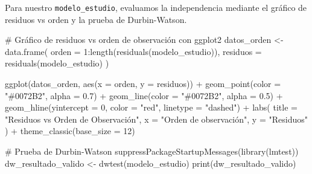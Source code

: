 \documentclass[
  letterpaper,
  DIV=11,
  numbers=noendperiod]{scrreprt}
\newenvironment{Shaded}{\begin{snugshade}}{\end{snugshade}}
\newcommand{\AttributeTok}[1]{\textcolor[rgb]{0.40,0.45,0.13}{#1}}
\newcommand{\CommentTok}[1]{\textcolor[rgb]{0.37,0.37,0.37}{#1}}
\newcommand{\DecValTok}[1]{\textcolor[rgb]{0.68,0.00,0.00}{#1}}
\newcommand{\FloatTok}[1]{\textcolor[rgb]{0.68,0.00,0.00}{#1}}
\newcommand{\FunctionTok}[1]{\textcolor[rgb]{0.28,0.35,0.67}{#1}}
\newcommand{\NormalTok}[1]{\textcolor[rgb]{0.00,0.23,0.31}{#1}}
\newcommand{\OtherTok}[1]{\textcolor[rgb]{0.00,0.23,0.31}{#1}}
\newcommand{\SpecialCharTok}[1]{\textcolor[rgb]{0.37,0.37,0.37}{#1}}
\newcommand{\StringTok}[1]{\textcolor[rgb]{0.13,0.47,0.30}{#1}}
\begin{document}
\begin{tcolorbox}[enhanced jigsaw, breakable, toprule=.15mm, bottomtitle=1mm, coltitle=black, colbacktitle=quarto-callout-tip-color!10!white, titlerule=0mm, opacitybacktitle=0.6, bottomrule=.15mm, toptitle=1mm, title=\textcolor{quarto-callout-tip-color}{\faLightbulb}\hspace{0.5em}{Ejemplo de independencia válida}, arc=.35mm, rightrule=.15mm, opacityback=0, colframe=quarto-callout-tip-color-frame, leftrule=.75mm, left=2mm, colback=white]

Para nuestro \texttt{modelo\_estudio}, evaluamos la independencia
mediante el gráfico de residuos vs orden y la prueba de Durbin-Watson.

\begin{Shaded}
\begin{Highlighting}[]
\CommentTok{\# Gráfico de residuos vs orden de observación con ggplot2}
\NormalTok{datos\_orden }\OtherTok{\textless{}{-}} \FunctionTok{data.frame}\NormalTok{(}
  \AttributeTok{orden =} \DecValTok{1}\SpecialCharTok{:}\FunctionTok{length}\NormalTok{(}\FunctionTok{residuals}\NormalTok{(modelo\_estudio)),}
  \AttributeTok{residuos =} \FunctionTok{residuals}\NormalTok{(modelo\_estudio)}
\NormalTok{)}

\FunctionTok{ggplot}\NormalTok{(datos\_orden, }\FunctionTok{aes}\NormalTok{(}\AttributeTok{x =}\NormalTok{ orden, }\AttributeTok{y =}\NormalTok{ residuos)) }\SpecialCharTok{+}
  \FunctionTok{geom\_point}\NormalTok{(}\AttributeTok{color =} \StringTok{"\#0072B2"}\NormalTok{, }\AttributeTok{alpha =} \FloatTok{0.7}\NormalTok{) }\SpecialCharTok{+}
  \FunctionTok{geom\_line}\NormalTok{(}\AttributeTok{color =} \StringTok{"\#0072B2"}\NormalTok{, }\AttributeTok{alpha =} \FloatTok{0.5}\NormalTok{) }\SpecialCharTok{+}
  \FunctionTok{geom\_hline}\NormalTok{(}\AttributeTok{yintercept =} \DecValTok{0}\NormalTok{, }\AttributeTok{color =} \StringTok{"red"}\NormalTok{, }\AttributeTok{linetype =} \StringTok{"dashed"}\NormalTok{) }\SpecialCharTok{+}
  \FunctionTok{labs}\NormalTok{(}
    \AttributeTok{title =} \StringTok{"Residuos vs Orden de Observación"}\NormalTok{,}
    \AttributeTok{x =} \StringTok{"Orden de observación"}\NormalTok{,}
    \AttributeTok{y =} \StringTok{"Residuos"}
\NormalTok{  ) }\SpecialCharTok{+}
  \FunctionTok{theme\_classic}\NormalTok{(}\AttributeTok{base\_size =} \DecValTok{12}\NormalTok{)}

\CommentTok{\# Prueba de Durbin{-}Watson}
\FunctionTok{suppressPackageStartupMessages}\NormalTok{(}\FunctionTok{library}\NormalTok{(lmtest))}
\NormalTok{dw\_resultado\_valido }\OtherTok{\textless{}{-}} \FunctionTok{dwtest}\NormalTok{(modelo\_estudio)}
\FunctionTok{print}\NormalTok{(dw\_resultado\_valido)}
\end{Highlighting}
\end{Shaded}


\end{tcolorbox}
\end{document}
